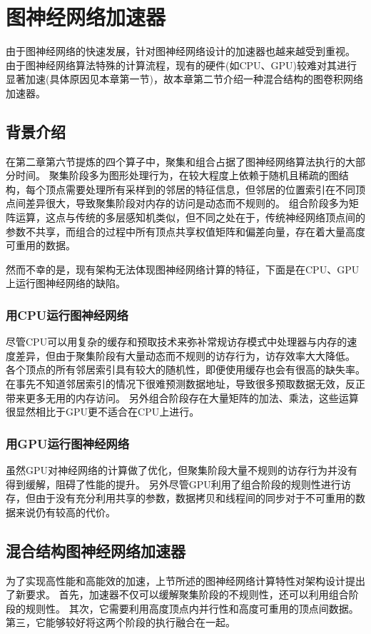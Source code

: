 
\chapter{图神经网络加速器}
由于图神经网络的快速发展，针对图神经网络设计的加速器也越来越受到重视。
由于图神经网络算法特殊的计算流程，现有的硬件(如CPU、GPU)较难对其进行显著加速(具体原因见本章第一节)，故本章第二节介绍一种混合结构的图卷积网络加速器。

\section{背景介绍}
在第二章第六节提炼的四个算子中，聚集和组合占据了图神经网络算法执行的大部分时间。
聚集阶段多为图形处理行为，在较大程度上依赖于随机且稀疏的图结构，每个顶点需要处理所有采样到的邻居的特征信息，但邻居的位置索引在不同顶点间差异很大，导致聚集阶段对内存的访问是动态而不规则的。
组合阶段多为矩阵运算，这点与传统的多层感知机类似，但不同之处在于，传统神经网络顶点间的参数不共享，而组合的过程中所有顶点共享权值矩阵和偏差向量，存在着大量高度可重用的数据。

然而不幸的是，现有架构无法体现图神经网络计算的特征，下面是在CPU、GPU上运行图神经网络的缺陷。

\subsection{用CPU运行图神经网络}
尽管CPU可以用复杂的缓存和预取技术来弥补常规访存模式中处理器与内存的速度差异，但由于聚集阶段有大量动态而不规则的访存行为，访存效率大大降低。
各个顶点的所有邻居索引具有较大的随机性，即便使用缓存也会有很高的缺失率。
在事先不知道邻居索引的情况下很难预测数据地址，导致很多预取数据无效，反正带来更多无用的内存访问。
另外组合阶段存在大量矩阵的加法、乘法，这些运算很显然相比于GPU更不适合在CPU上进行。

\subsection{用GPU运行图神经网络}
虽然GPU对神经网络的计算做了优化，但聚集阶段大量不规则的访存行为并没有得到缓解，阻碍了性能的提升。
另外尽管GPU利用了组合阶段的规则性进行访存，但由于没有充分利用共享的参数，数据拷贝和线程间的同步对于不可重用的数据来说仍有较高的代价。

\section{混合结构图神经网络加速器}
为了实现高性能和高能效的加速，上节所述的图神经网络计算特性对架构设计提出了新要求。
首先，加速器不仅可以缓解聚集阶段的不规则性，还可以利用组合阶段的规则性。 
其次，它需要利用高度顶点内并行性和高度可重用的顶点间数据。 
第三，它能够较好将这两个阶段的执行融合在一起。

